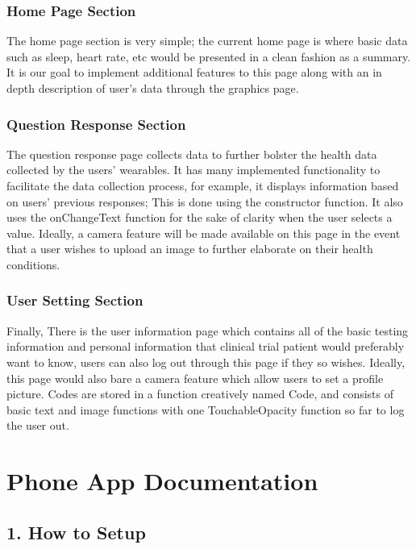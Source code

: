 \documentclass[]{book}
\begin{document}
\subsection{Home Page Section}\label{home-page-section}

The home page section is very simple; the current home page is where
basic data such as sleep, heart rate, etc would be presented in a clean
fashion as a summary. It is our goal to implement additional features to
this page along with an in depth description of user's data through the
graphics page.

\subsection{Question Response Section}\label{question-response-section}

The question response page collects data to further bolster the health
data collected by the users' wearables. It has many implemented
functionality to facilitate the data collection process, for example, it
displays information based on users' previous responses; This is done
using the constructor function. It also uses the onChangeText function
for the sake of clarity when the user selects a value. Ideally, a camera
feature will be made available on this page in the event that a user
wishes to upload an image to further elaborate on their health
conditions.

\subsection{User Setting Section}\label{user-setting-section}

Finally, There is the user information page which contains all of the
basic testing information and personal information that clinical trial
patient would preferably want to know, users can also log out through
this page if they so wishes. Ideally, this page would also bare a camera
feature which allow users to set a profile picture. Codes are stored in
a function creatively named Code, and consists of basic text and image
functions with one TouchableOpacity function so far to log the user out.

\chapter{Phone App Documentation}\label{phone-app-documentation}

\section{1. How to Setup}\label{how-to-setup}
\end{document}
